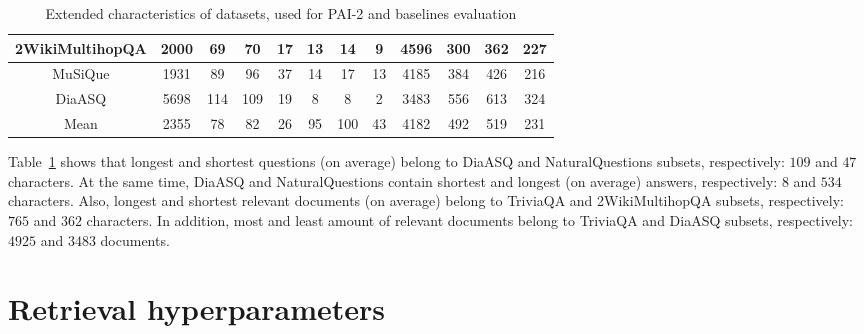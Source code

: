 \begin{table}[H]
\begin{tabular}{|c|ccccccc|cccc|}
        2WikiMultihopQA & \multicolumn{1}{c|}{2000} & \multicolumn{1}{c|}{69} & \multicolumn{1}{c|}{70} & \multicolumn{1}{c|}{17} & \multicolumn{1}{c|}{13} & \multicolumn{1}{c|}{14} & 9 & \multicolumn{1}{c|}{4596} & \multicolumn{1}{c|}{300} & \multicolumn{1}{c|}{362} & 227 \\ \hline
        MuSiQue & \multicolumn{1}{c|}{1931} & \multicolumn{1}{c|}{89} & \multicolumn{1}{c|}{96} & \multicolumn{1}{c|}{37} & \multicolumn{1}{c|}{14} & \multicolumn{1}{c|}{17} & 13 & \multicolumn{1}{c|}{4185} & \multicolumn{1}{c|}{384} & \multicolumn{1}{c|}{426} & 216 \\ \hline
        DiaASQ & \multicolumn{1}{c|}{5698} & \multicolumn{1}{c|}{114} & \multicolumn{1}{c|}{109} & \multicolumn{1}{c|}{19} & \multicolumn{1}{c|}{8} & \multicolumn{1}{c|}{8} & 2 & \multicolumn{1}{c|}{3483} & \multicolumn{1}{c|}{556} & \multicolumn{1}{c|}{613} & 324 \\ \hline \hline
        Mean & \multicolumn{1}{c|}{2355} & \multicolumn{1}{c|}{78} & \multicolumn{1}{c|}{82} & \multicolumn{1}{c|}{26} & \multicolumn{1}{c|}{95} & \multicolumn{1}{c|}{100} & 43 & \multicolumn{1}{c|}{4182} & \multicolumn{1}{c|}{492} & \multicolumn{1}{c|}{519} & 231 \\ \hline
		\end{tabular}%
	\renewcommand{\arraystretch}{1}
	\caption{Extended characteristics of datasets, used for PAI-2 and baselines evaluation}
	\label{tab:datasets_stats}
\end{table}

Table~\ref{tab:datasets_stats} shows that longest and shortest questions (on average) belong to DiaASQ and NaturalQuestions subsets, respectively: $109$ and $47$ characters. At the same time, DiaASQ and NaturalQuestions contain shortest and longest (on average) answers, respectively: $8$ and $534$ characters. Also, longest and shortest relevant documents (on average) belong to TriviaQA and 2WikiMultihopQA subsets, respectively: $765$ and $362$ characters. In addition, most and least amount of relevant documents belong to TriviaQA and DiaASQ subsets, respectively: $4925$ and $3483$ documents.


\section{Retrieval hyperparameters}
\label{app:retriev_hyper}

